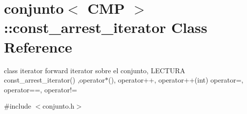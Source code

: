 \hypertarget{classconjunto_1_1const__arrest__iterator}{}\section{conjunto$<$ C\+M\+P $>$\+:\+:const\+\_\+arrest\+\_\+iterator Class Reference}
\label{classconjunto_1_1const__arrest__iterator}


class iterator forward iterator sobre el conjunto, L\+E\+C\+T\+U\+R\+A const\+\_\+arrest\+\_\+iterator() ,operator$\ast$(), operator++, operator++(int) operator=, operator==, operator!=  




{\ttfamily \#include $<$conjunto.\+h$>$}


